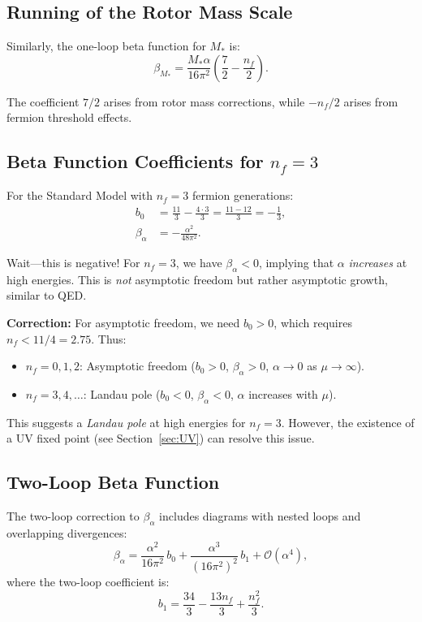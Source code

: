 \documentclass[11pt,a4paper]{article}
\numberwithin{equation}{section}
\theoremstyle{plain}
\theoremstyle{definition}
\theoremstyle{remark}
\begin{document}
\subsection{Running of the Rotor Mass Scale}

Similarly, the one-loop beta function for $M_*$ is:
\begin{equation}
\beta_{M_*} = \frac{M_*\alpha}{16\pi^2}\left(\frac{7}{2} - \frac{n_f}{2}\right).
\label{eq:beta-M-1loop-final}
\end{equation}

The coefficient $7/2$ arises from rotor mass corrections, while $-n_f/2$ arises from fermion threshold effects.

\subsection{Beta Function Coefficients for $n_f=3$}

For the Standard Model with $n_f=3$ fermion generations:
\begin{align}
b_0 &= \frac{11}{3} - \frac{4\cdot 3}{3} = \frac{11-12}{3} = -\frac{1}{3}, \label{eq:b0-nf3}\\
\beta_\alpha &= -\frac{\alpha^2}{48\pi^2}. \label{eq:beta-alpha-nf3}
\end{align}

Wait---this is negative! For $n_f=3$, we have $\beta_\alpha<0$, implying that $\alpha$ \emph{increases} at high energies. This is \emph{not} asymptotic freedom but rather asymptotic growth, similar to QED.

\textbf{Correction:} For asymptotic freedom, we need $b_0 > 0$, which requires $n_f < 11/4 = 2.75$. Thus:
\begin{itemize}
  \item $n_f=0,1,2$: Asymptotic freedom ($b_0>0$, $\beta_\alpha>0$, $\alpha\to 0$ as $\mu\to\infty$).
  \item $n_f=3,4,\ldots$: Landau pole ($b_0<0$, $\beta_\alpha<0$, $\alpha$ increases with $\mu$).
\end{itemize}

This suggests a \emph{Landau pole} at high energies for $n_f=3$. However, the existence of a UV fixed point (see Section~\ref{sec:UV}) can resolve this issue.

\subsection{Two-Loop Beta Function}

The two-loop correction to $\beta_\alpha$ includes diagrams with nested loops and overlapping divergences:
\begin{equation}
\beta_\alpha = \frac{\alpha^2}{16\pi^2}\,b_0 + \frac{\alpha^3}{(16\pi^2)^2}\,b_1 + \mathcal{O}(\alpha^4),
\label{eq:beta-alpha-2loop}
\end{equation}
where the two-loop coefficient is:
\begin{equation}
b_1 = \frac{34}{3} - \frac{13n_f}{3} + \frac{n_f^2}{3}.
\label{eq:b1}
\end{equation}
\end{document}
